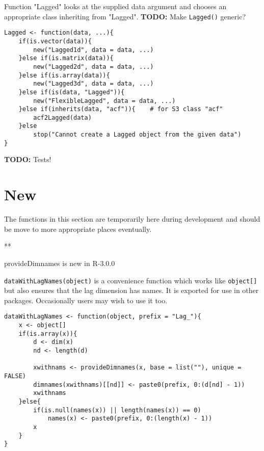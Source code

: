 \documentclass[11pt,a4paper]{article}
\begin{document}
Function "Lagged" looks at the supplied data argument and chooses an appropriate class
inheriting from "Lagged". \textbf{TODO:} Make \texttt{Lagged()} generic?
\begin{verbatim}
Lagged <- function(data, ...){
    if(is.vector(data)){
        new("Lagged1d", data = data, ...)
    }else if(is.matrix(data)){
        new("Lagged2d", data = data, ...)
    }else if(is.array(data)){
        new("Lagged3d", data = data, ...)
    }else if(is(data, "Lagged")){
        new("FlexibleLagged", data = data, ...)
    }else if(inherits(data, "acf")){    # for S3 class "acf"
        acf2Lagged(data)
    }else
        stop("Cannot create a Lagged object from the given data")
}
\end{verbatim}

\textbf{TODO:} Tests!

\section{New}
\label{sec:org95242a5}

The functions in this section are temporarily here during development and should be move to
more appropriate places eventually.

**

provideDimnames is new in R-3.0.0

\texttt{dataWithLagNames(object)} is a convenience function which works like
\texttt{object[]} but also ensures that the lag dimension has names. It is exported for use in other
packages. Occasionally users may wish to use it too.
\begin{verbatim}
dataWithLagNames <- function(object, prefix = "Lag_"){
    x <- object[]
    if(is.array(x)){
        d <- dim(x)
        nd <- length(d)

        xwithnams <- provideDimnames(x, base = list(""), unique = FALSE)
        dimnames(xwithnams)[[nd]] <- paste0(prefix, 0:(d[nd] - 1))
        xwithnams
    }else{
        if(is.null(names(x)) || length(names(x)) == 0)
            names(x) <- paste0(prefix, 0:(length(x) - 1))
        x
    }
}
\end{verbatim}
\end{document}
